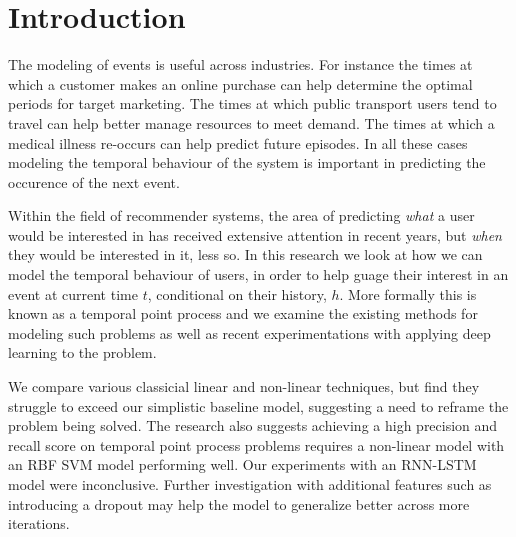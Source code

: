 
\chapter{Introduction} %

\label{Chapter1} %


\newcommand{\keyword}[1]{\textbf{#1}}
\newcommand{\tabhead}[1]{\textbf{#1}}
\newcommand{\code}[1]{\texttt{#1}}
\newcommand{\file}[1]{\texttt{\bfseries#1}}
\newcommand{\option}[1]{\texttt{\itshape#1}}

The modeling of events is useful across industries. For instance the times at which a customer makes an online purchase can help determine the optimal periods for target marketing. The times at which public transport users tend to travel can help better manage resources to meet demand. The times at which a medical illness re-occurs can help predict future episodes. In all these cases modeling the temporal behaviour of the system is important in predicting the occurence of the next event. 

Within the field of recommender systems, the area of predicting \textit{what} a user would be interested in has received extensive attention in recent years, but \textit{when} they would be interested in it, less so. In this research we look at how we can model the temporal behaviour of users, in order to help guage their interest in an event at current time $t$, conditional on their history, $h$. More formally this is known as a temporal point process and we examine the existing methods for modeling such problems as well as recent experimentations with applying deep learning to the problem.

We compare various classicial linear and non-linear techniques, but find they struggle to exceed our simplistic baseline model, suggesting a need to reframe the problem being solved. The research also suggests achieving a high precision and recall score on temporal point process problems requires a non-linear model with an RBF SVM model performing well. Our experiments with an RNN-LSTM model were inconclusive. Further investigation with additional features such as introducing a dropout may help the model to generalize better across more iterations.


